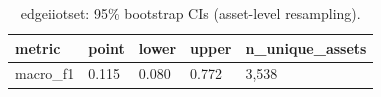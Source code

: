 \begin{table}[t]
\centering
\caption{edgeiiotset: 95\% bootstrap CIs (asset-level resampling).}
\label{tab:edgeiiotset_bootstrap_ci}
\begin{tabular}{lllll}
\toprule
metric & point & lower & upper & n\_unique\_assets \\
\midrule
macro\_f1 & 0.115 & 0.080 & 0.772 & 3,538 \\
\bottomrule
\end{tabular}
\end{table}
